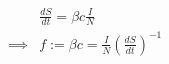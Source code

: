 \documentclass[11pt]{article}
\begin{document}
\begin{align*}
    & \frac{dS}{dt} = \beta c \frac{I}{N} \\
    \implies &f := \beta c = \frac{I}{N} \left(\frac{dS}{dt}\right)^{-1}
\end{align*}
\end{document}
